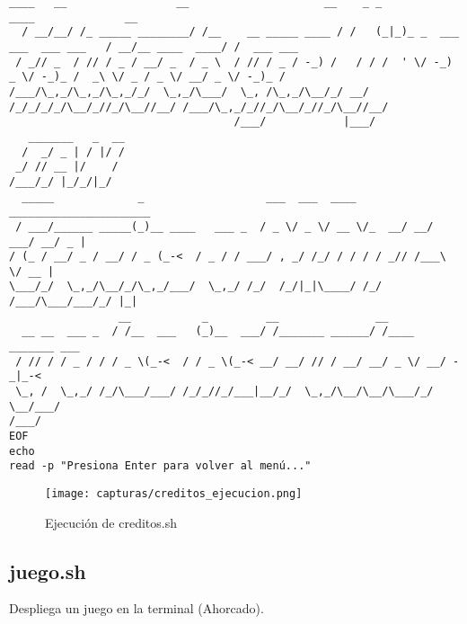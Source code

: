 \documentclass[12pt]{article}
\begin{document}
\begin{lstlisting}[caption={creditos.sh}]
   ____   __                 __                     __    _ _                          ____              __         
  / __/__/ /_ _____ ________/ /__    __ _____ ____ / /   (_|_)_ _  ___ ___  ___ ___   / __/__ ____  ____/ /  ___ ___
 / _// _  / // / _ / __/ _  / _ \  / // / _ / -_) /   / / /  ' \/ -_) _ \/ -_)_ /  _\ \/ _ / _ \/ __/ _ \/ -_)_ /
/___/\_,_/\_,_/\_,_/_/  \_,_/\___/  \_, /\_,_/\__/_/ __/ /_/_/_/_/\__/_//_/\__//__/ /___/\_,_/_//_/\__/_//_/\__//__/
                                   /___/            |___/                     
   _______   _  __
  /  _/ _ | / |/ /
 _/ // __ |/    / 
/___/_/ |_/_/|_/  
  _____             _                   ___  ___  ____  ______________________     
 / ___/______ _____(_)__ ____   ___ _  / _ \/ _ \/ __ \/_  __/ __/ ___/ __/ _ |    
/ (_ / __/ _ / __/ / _ (_-<  / _ / / ___/ , _/ /_/ / / / / _// /___\ \/ __ |    
\___/_/  \_,_/\__/_/\_,_/___/  \_,_/ /_/  /_/|_|\____/ /_/ /___/\___/___/_/ |_|    
                 __           _         __               __                        
  __ __  ___ _  / /__  ___   (_)__  ___/ /_______ ______/ /____  _______ ___       
 / // / / _ / / / _ \(_-<  / / _ \(_-< __/ __/ // / __/ __/ _ \/ __/ -_|_-<       
 \_, /  \_,_/ /_/\___/___/ /_/_//_/___|__/_/  \_,_/\__/\__/\___/_/  \__/___/       
/___/                                                                              
EOF
echo
read -p "Presiona Enter para volver al menú..."
\end{lstlisting}

\begin{figure}[H]
    \centering
    \texttt{[image: capturas/creditos\_ejecucion.png]}
    \caption{Ejecución de creditos.sh}
\end{figure}

\newpage
\subsection{juego.sh}
Despliega un juego en la terminal (Ahorcado).
\end{document}
